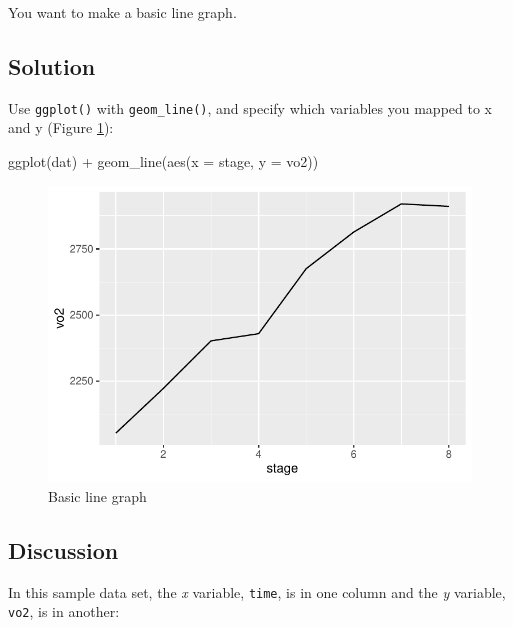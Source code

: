 \documentclass[
]{book}
\newenvironment{Shaded}{\begin{snugshade}}{\end{snugshade}}
\newcommand{\AttributeTok}[1]{\textcolor[rgb]{0.77,0.63,0.00}{#1}}
\newcommand{\FunctionTok}[1]{\textcolor[rgb]{0.00,0.00,0.00}{#1}}
\newcommand{\NormalTok}[1]{#1}
\newcommand{\SpecialCharTok}[1]{\textcolor[rgb]{0.00,0.00,0.00}{#1}}
\begin{document}
You want to make a basic line graph.

\hypertarget{solution-22}{%
\subsection{Solution}\label{solution-22}}

Use \texttt{ggplot()} with \texttt{geom\_line()}, and specify which variables you mapped to x and y (Figure \ref{fig:FIG-LINE-GRAPH-BASIC-LINE}):

\begin{Shaded}
\begin{Highlighting}[]

\FunctionTok{ggplot}\NormalTok{(dat) }\SpecialCharTok{+}
  \FunctionTok{geom\_line}\NormalTok{(}\FunctionTok{aes}\NormalTok{(}\AttributeTok{x =}\NormalTok{ stage, }\AttributeTok{y =}\NormalTok{ vo2))  }
\end{Highlighting}
\end{Shaded}

\begin{figure}

{\centering \includegraphics[width=0.5\linewidth]{se201_stats_book_files/figure-latex/FIG-LINE-GRAPH-BASIC-LINE-1} 

}

\caption[Basic line graph]{Basic line graph}\label{fig:FIG-LINE-GRAPH-BASIC-LINE}
\end{figure}

\hypertarget{discussion-12}{%
\subsection{Discussion}\label{discussion-12}}

In this sample data set, the \emph{x} variable, \texttt{time}, is in one column and the \emph{y} variable, \texttt{vo2}, is in another:
\end{document}
